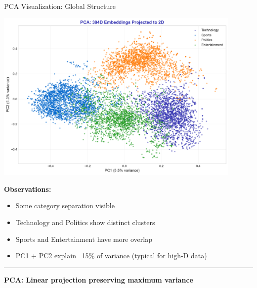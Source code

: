 \documentclass[8pt,aspectratio=169]{beamer}
\newcommand{\bottomnote}[1]{%
\vfill
\vspace{-2mm}
\textcolor{mllavender2}{\rule{\textwidth}{0.4pt}}
\vspace{1mm}
\footnotesize
\textbf{#1}
}
\begin{document}
\begin{frame}[t]{PCA Visualization: Global Structure}

\begin{center}
\includegraphics[width=0.9\textwidth]{charts/pca_visualization.pdf}
\end{center}

\textbf{Observations:}
\begin{itemize}
    \item Some category separation visible
    \item Technology and Politics show distinct clusters
    \item Sports and Entertainment have more overlap
    \item PC1 + PC2 explain ~15\% of variance (typical for high-D data)
\end{itemize}

\bottomnote{PCA: Linear projection preserving maximum variance}
\end{frame}
\end{document}
